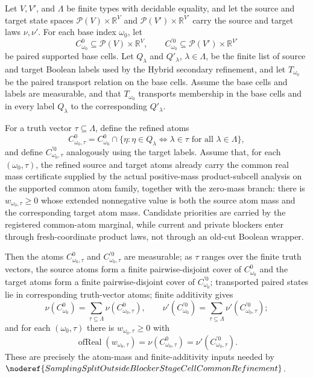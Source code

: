 \begin{helper}
Let \(V,V'\), and \(\Lambda\) be finite types with decidable equality, and
let the source and target state spaces
\(\mathcal P(V)\times\mathbb R^V\) and
\(\mathcal P(V')\times\mathbb R^{V'}\) carry the source and target laws
\(\nu,\nu'\).  For each base index \(\omega_0\), let
\[
C^0_{\omega_0}\subseteq \mathcal P(V)\times\mathbb R^V,\qquad
C^{\prime0}_{\omega_0}\subseteq \mathcal P(V')\times\mathbb R^{V'}
\]
be paired supported base cells.  Let
\(Q_\lambda\) and \(Q'_\lambda\), \(\lambda\in\Lambda\), be the finite list
of source and target Boolean labels used by the Hybrid secondary refinement,
and let \(T_{\omega_0}\) be the paired transport relation on the base cells.
Assume the base cells and labels are measurable, and that \(T_{\omega_0}\)
transports membership in the base cells and in every label \(Q_\lambda\) to
the corresponding \(Q'_\lambda\).

For a truth vector \(\tau\subseteq\Lambda\), define the refined atoms
\[
C^0_{\omega_0,\tau}
=C^0_{\omega_0}\cap
  \{\eta:\eta\in Q_\lambda\Longleftrightarrow\lambda\in\tau
      \text{ for all }\lambda\in\Lambda\},
\]
and define \(C^{\prime0}_{\omega_0,\tau}\) analogously using the target
labels.  Assume that, for each \((\omega_0,\tau)\), the refined source and
target atoms already carry the common real mass certificate supplied by the
actual positive-mass product-subcell analysis on the supported common atom
family, together with the zero-mass branch: there is
\(w_{\omega_0,\tau}\ge0\) whose extended nonnegative value is both the source
atom mass and the corresponding target atom mass.  Candidate priorities are
carried by the registered common-atom marginal, while current and private
blockers enter through fresh-coordinate product laws, not through an old-cut
Boolean wrapper.

Then the atoms \(C^0_{\omega_0,\tau}\) and
\(C^{\prime0}_{\omega_0,\tau}\) are measurable; as \(\tau\) ranges over the
finite truth vectors, the source atoms form a finite pairwise-disjoint cover
of \(C^0_{\omega_0}\) and the target atoms form a finite pairwise-disjoint
cover of \(C^{\prime0}_{\omega_0}\); transported paired states lie in
corresponding truth-vector atoms; finite additivity gives
\[
\nu(C^0_{\omega_0})=\sum_{\tau\subseteq\Lambda}
  \nu(C^0_{\omega_0,\tau}),\qquad
\nu'(C^{\prime0}_{\omega_0})=\sum_{\tau\subseteq\Lambda}
  \nu'(C^{\prime0}_{\omega_0,\tau});
\]
and for each \((\omega_0,\tau)\) there is \(w_{\omega_0,\tau}\ge0\) with
\[
\operatorname{ofReal}(w_{\omega_0,\tau})
=\nu(C^0_{\omega_0,\tau})
=\nu'(C^{\prime0}_{\omega_0,\tau}).
\]
These are precisely the atom-mass and finite-additivity inputs needed by
\(\noderef{SamplingSplitOutsideBlockerStageCellCommonRefinement}\).
\end{helper}
